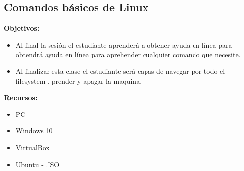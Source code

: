 \documentclass[11pt,twoside]{book}
\begin{document}
\subsection{Comandos básicos de Linux}

\textbf{Objetivos:}
\begin{itemize}
  \item Al final la sesión el estudiante aprenderá a obtener ayuda en línea para obtendrá ayuda en línea para aprehender cualquier comando que necesite.
  \item Al finalizar esta clase el estudiante será capas de navegar por todo el filesystem , prender y apagar la maquina.
\end{itemize}

\textbf{Recursos:}
\begin{itemize}
  \item PC
  \item Windows 10
  \item VirtualBox
  \item Ubuntu - .ISO
\end{itemize}
\end{document}
